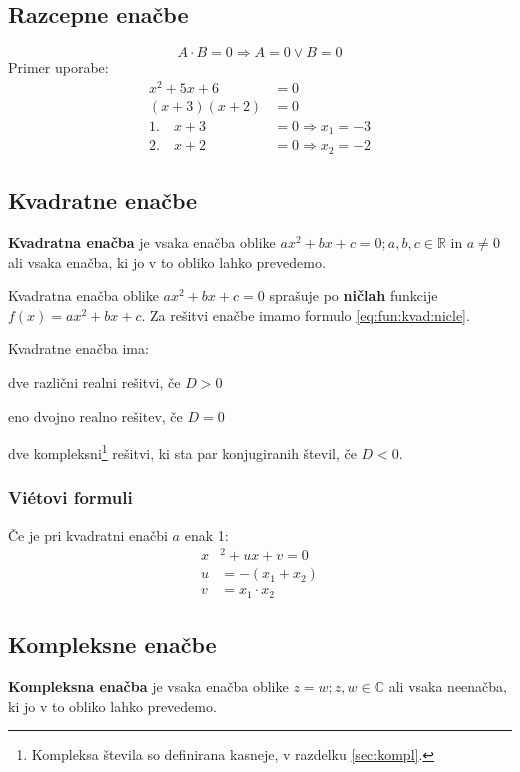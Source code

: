 \documentclass[a4paper,oneside,12pt,fleqn]{article}
\def\R{\ensuremath{\mathbb R}}
\def\C{\ensuremath{\mathbb C}}
\newcommand\krat\cdot
\renewcommand\implies\Rightarrow
\numberwithin{equation}{section}
\newenvironment{itemize*}%
{
\vspace{-12pt}%
\begin{itemize}%
\setlength{\itemsep}{0pt}%
\setlength{\parskip}{2pt}}%
{\end{itemize}}
\begin{document}
\subsection{Razcepne enačbe}
\label{sec:enac:razc}
\[ A \krat B = 0 \implies A = 0 \lor B = 0 \]
Primer uporabe:
\begin{align*}
  x^2 +5x + 6 &= 0 \\
  (x+3)(x+2) &= 0 \\
  1.\quad x + 3 &= 0 \implies x_1 = -3 \\
  2.\quad x + 2 &= 0 \implies x_2 = -2
\end{align*}

\subsection{Kvadratne enačbe}
\label{sec:enac:kvad}
\textbf{Kvadratna enačba} je vsaka enačba oblike $ax^2 + bx + c = 0; a, b, c \in \R$ in $a \neq 0$
ali vsaka enačba, ki jo v to obliko lahko prevedemo.

Kvadratna enačba oblike $ax^2 + bx + c = 0$ sprašuje po \textbf{ničlah} funkcije $f(x) = ax^2 + bx
+ c$. Za rešitvi enačbe imamo formulo \eqref{eq:fun:kvad:nicle}.

Kvadratne enačba ima:
\begin{itemize*}
  \item dve različni realni rešitvi, če $D > 0$
  \item eno dvojno realno rešitev, če $D = 0$
  \item dve kompleksni\footnote{Kompleksa števila so definirana kasneje, v razdelku
    \ref{sec:kompl}.} rešitvi, ki sta par konjugiranih števil, če $D < 0$.
\end{itemize*}

\subsubsection{Vi\'{e}tovi formuli}
\label{sec:enac:kvad:viet}
Če je pri kvadratni enačbi $a$ enak 1:
\begin{align*}
  x&^2 + ux + v = 0 \\
  u& = -(x_1 + x_2) \\
  v& = x_1 \krat x_2
\end{align*}

\subsection{Kompleksne enačbe}
\label{sec:enac:kompl}
\textbf{Kompleksna enačba} je vsaka enačba oblike $z = w; z, w \in \C$ ali vsaka neenačba, ki jo v
to obliko lahko prevedemo.
\end{document}
